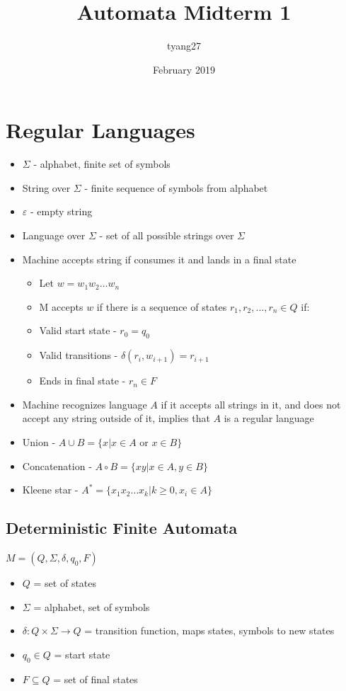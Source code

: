\documentclass{article}
\title{Automata Midterm 1}
\author{tyang27 }
\date{February 2019}
\begin{document}
\maketitle

\section{Regular Languages}
\begin{itemize}
    \item $\Sigma$ - alphabet, finite set of symbols
    \item String over $\Sigma$ - finite sequence of symbols from alphabet
    \item $\varepsilon$ - empty string
    \item Language over $\Sigma$ - set of all possible strings over $\Sigma$
    \item Machine accepts string if consumes it and lands in a final state
    \begin{itemize}
        \item Let $w=w_1 w_2\dots w_n$
        \item M accepts $w$ if there is a sequence of states $r_1, r_2, \dots, r_n \in Q$ if:
        \item Valid start state - $r_0 = q_0$
        \item Valid transitions - $\delta(r_i, w_{i+1}) = r_{i+1}$
        \item Ends in final state - $r_n \in F$
    \end{itemize}
    \item Machine recognizes language $A$ if it accepts all strings in it, and does not accept any string outside of it, implies that $A$ is a regular language
    \item Union - $A \cup B = \{x | x \in A \textrm{ or } x \in B\}$
    \item Concatenation - $A \circ B = \{xy | x \in A, y \in B\}$
    \item Kleene star - $A^* = \{x_1x_2\dots x_k | k \geq 0, x_i \in A\}$
\end{itemize}
\subsection{Deterministic Finite Automata}
$M = (Q, \Sigma, \delta, q_0, F)$
\begin{itemize}
    \item $Q$ = set of states
    \item $\Sigma$ = alphabet, set of symbols
    \item $\delta : Q \times \Sigma \rightarrow Q$ = transition function, maps states, symbols to new states
    \item $q_0 \in Q$ = start state
    \item $F \subseteq Q$ = set of final states
\end{itemize}
\end{document}
